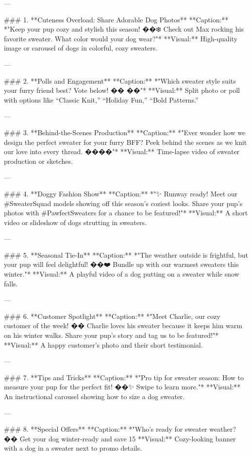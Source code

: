 \documentclass[12pt]{article}
\begin{document}
\begin{enumerate}
\begin{itemize}
---

### 1. **Cuteness Overload: Share Adorable Dog Photos**
   **Caption:**  
   *"Keep your pup cozy and stylish this season! ��❄️ Check out Max rocking his favorite sweater. What color would your dog wear?"*  
   **Visual:**  
   High-quality image or carousel of dogs in colorful, cozy sweaters.

---

### 2. **Polls and Engagement**
   **Caption:**  
   *"Which sweater style suits your furry friend best? Vote below! �� ��"*  
   **Visual:**  
   Split photo or poll with options like “Classic Knit,” “Holiday Fun,” “Bold Patterns.”

---

### 3. **Behind-the-Scenes Production**
   **Caption:**  
   *"Ever wonder how we design the perfect sweater for your furry BFF? Peek behind the scenes as we knit our love into every thread. ����"*  
   **Visual:**  
   Time-lapse video of sweater production or sketches.

---

### 4. **Doggy Fashion Show**
   **Caption:**  
   *"✨ Runway ready! Meet our #SweaterSquad models showing off this season’s coziest looks. Share your pup’s photos with #PawfectSweaters for a chance to be featured!"*  
   **Visual:**  
   A short video or slideshow of dogs strutting in sweaters.

---

### 5. **Seasonal Tie-In**
   **Caption:**  
   *"The weather outside is frightful, but your pup will feel delightful! ��❤️ Bundle up with our warmest sweaters this winter."*  
   **Visual:**  
   A playful video of a dog putting on a sweater while snow falls.

---

### 6. **Customer Spotlight**
   **Caption:**  
   *"Meet Charlie, our cozy customer of the week! �� Charlie loves his sweater because it keeps him warm on his winter walks. Share your pup’s story and tag us to be featured!"*  
   **Visual:**  
   A happy customer’s photo and their short testimonial.

---

### 7. **Tips and Tricks**
   **Caption:**  
   *"Pro tip for sweater season: How to measure your pup for the perfect fit! ��✨ Swipe to learn more."*  
   **Visual:**  
   An instructional carousel showing how to size a dog sweater.

---

### 8. **Special Offers**
   **Caption:**  
   *"Who’s ready for sweater weather? �� Get your dog winter-ready and save 15%
   **Visual:**  
   Cozy-looking banner with a dog in a sweater next to promo details.


\end{itemize}
\end{enumerate}
\end{document}
